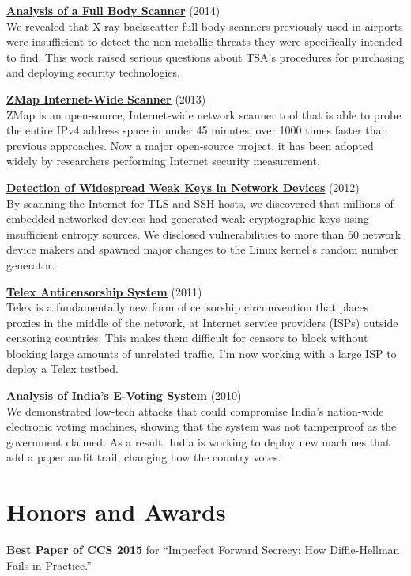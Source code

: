 \documentclass[margin,11pt]{res} %
\begin{document}
\textbf{\href{https://radsec.org}{Analysis of a Full Body Scanner}} (2014)\\
We revealed that X-ray backscatter full-body scanners previously used in airports were insufficient to detect the non-metallic threats they were specifically intended to find. This work raised serious questions about TSA's procedures for purchasing and deploying security technologies.

\textbf{\href{https://zmap.io/}{ZMap Internet-Wide Scanner}} (2013)\\
ZMap is an open-source, Internet-wide network scanner tool that is able to probe the entire IPv4 address space in under 45 minutes, over 1000 times faster than previous approaches. Now a major open-source project, it has been adopted widely by researchers performing Internet security measurement.

\textbf{\href{https://factorable.net/}{Detection of Widespread Weak Keys in Network Devices}} (2012)\\
By scanning the Internet for TLS and SSH hosts, we discovered that millions of embedded networked devices had generated weak cryptographic keys using insufficient entropy sources. We disclosed vulnerabilities to more than 60 network device makers and spawned major changes to the Linux kernel's random number generator.

\textbf{\href{https://telex.cc/}{Telex Anticensorship System}} (2011)\\
Telex is a fundamentally new form of censorship circumvention that places proxies in the middle of the network, at Internet service providers (ISPs) outside censoring countries.  This makes them difficult for censors to block without blocking large amounts of unrelated traffic. I'm now working with a large ISP to deploy a Telex testbed.

\textbf{\href{http://indiaevm.org/}{Analysis of India's E-Voting System}} (2010)\\
We demonstrated low-tech attacks that could compromise India's nation-wide electronic voting machines, showing that the system was not tamperproof as the government claimed.  As a result, India is working to deploy new machines that add a paper audit trail, changing how the country votes.

\vspace{6pt}
\newpage
\section{\large Honors and Awards}
    \textbf{Best Paper of CCS 2015}
    for ``Imperfect Forward Secrecy: How Diffie-Hellman Fails in Practice.''
\end{document}
